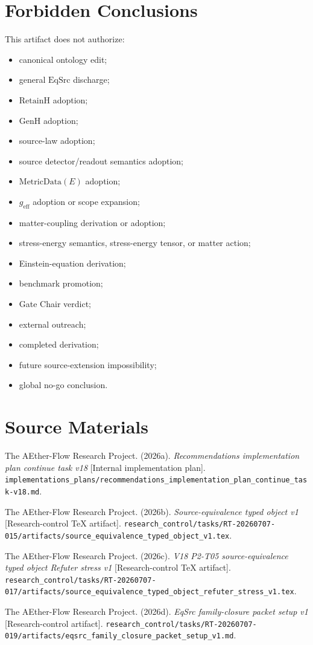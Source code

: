 \documentclass[11pt]{article}
\newcommand{\EqSrc}{\mathrm{EqSrc}}
\newcommand{\RetainH}{\mathrm{RetainH}}
\newcommand{\GenH}{\mathrm{GenH}}
\begin{document}
\section{Forbidden Conclusions}

This artifact does not authorize:

\begin{itemize}[leftmargin=*]
  \item canonical ontology edit;
  \item general \(\EqSrc\) discharge;
  \item \(\RetainH\) adoption;
  \item \(\GenH\) adoption;
  \item source-law adoption;
  \item source detector/readout semantics adoption;
  \item \(\mathrm{MetricData}(E)\) adoption;
  \item \(g_{\mathrm{eff}}\) adoption or scope expansion;
  \item matter-coupling derivation or adoption;
  \item stress-energy semantics, stress-energy tensor, or matter action;
  \item Einstein-equation derivation;
  \item benchmark promotion;
  \item Gate Chair verdict;
  \item external outreach;
  \item completed derivation;
  \item future source-extension impossibility;
  \item global no-go conclusion.
\end{itemize}

\section{Source Materials}

The AEther-Flow Research Project. (2026a). \emph{Recommendations
implementation plan continue task v18} [Internal implementation plan].
\texttt{implementations\_plans/recommendations\_implementation\_plan\_continue\_task-v18.md}.

The AEther-Flow Research Project. (2026b). \emph{Source-equivalence typed
object v1} [Research-control TeX artifact].
\texttt{research\_control/tasks/RT-20260707-015/artifacts/source\_equivalence\_typed\_object\_v1.tex}.

The AEther-Flow Research Project. (2026c). \emph{V18 P2-T05
source-equivalence typed object Refuter stress v1} [Research-control TeX
artifact].
\texttt{research\_control/tasks/RT-20260707-017/artifacts/source\_equivalence\_typed\_object\_refuter\_stress\_v1.tex}.

The AEther-Flow Research Project. (2026d). \emph{EqSrc family-closure packet
setup v1} [Research-control artifact].
\texttt{research\_control/tasks/RT-20260707-019/artifacts/eqsrc\_family\_closure\_packet\_setup\_v1.md}.
\end{document}

